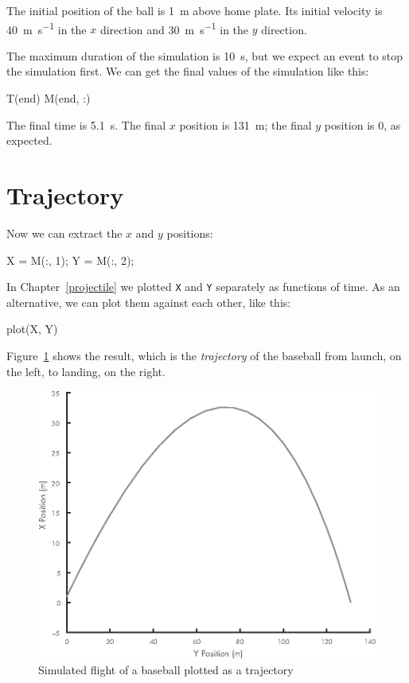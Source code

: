 The initial position of the ball is \SI{1}{\meter} above home plate.  Its initial velocity is \SI{40}{\meter\per\second} in the $x$ direction and \SI{30}{\meter\per\second} in the $y$ direction.


The maximum duration of the simulation is \SI{10}{\second}, but we expect an event to stop the simulation first.  We can get the final values of the simulation like this:
    
\begin{code}
    T(end)
    M(end, :)
\end{code}

The final time is \SI{5.1}{\second}.  The final $x$ position is \SI{131}{\meter}; the final $y$ position is 0, as expected.


\section{Trajectory}

Now we can extract the $x$ and $y$ positions:

\begin{code}
    X = M(:, 1);
    Y = M(:, 2);
\end{code}

In Chapter~\ref{projectile} we plotted \lstinline{X} and \lstinline{Y} separately as functions of time.  As an alternative, we can plot them against each other, like this:

\begin{code}
    plot(X, Y)
\end{code}


Figure~\ref{fig:baseball3} shows the result, which is the \emph{trajectory} of the baseball from launch, on the left, to landing, on the right.

\begin{figure}[H]
\includegraphics{book/images/figure13_01_new.eps}
\caption{Simulated flight of a baseball plotted as a trajectory}
\label{fig:baseball3}
\end{figure}


